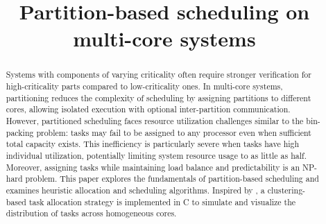 \documentclass[conference]{IEEEtran}
\begin{document}
\title{Partition-based scheduling on multi-core systems\\
}

\author{
}

\maketitle

\begin{abstract}
Systems with components of varying criticality often require stronger verification for high-criticality parts compared to low-criticality ones. In multi-core systems, partitioning reduces the complexity of scheduling by assigning partitions to different cores, allowing isolated execution with optional inter-partition communication. However, partitioned scheduling faces resource utilization challenges similar to the bin-packing problem: tasks may fail to be assigned to any processor even when sufficient total capacity exists. This inefficiency is particularly severe when tasks have high individual utilization, potentially limiting system resource usage to as little as half. Moreover, assigning tasks while maintaining load balance and predictability is an NP-hard problem. This paper explores the fundamentals of partition-based scheduling and examines heuristic allocation and scheduling algorithms. Inspired by \cite{AbdallahGB24}, a clustering-based task allocation strategy is implemented in C to simulate and visualize the distribution of tasks across homogeneous cores.


\end{abstract}
\end{document}
